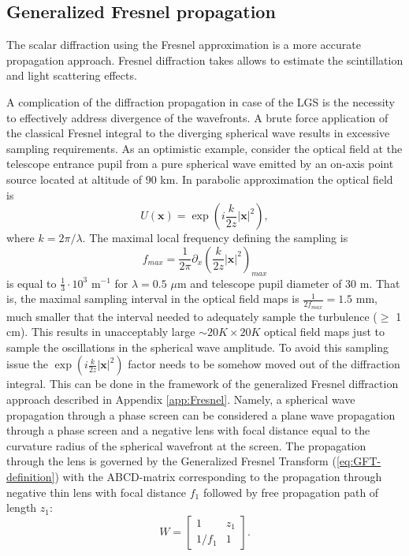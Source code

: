\subsection{Generalized Fresnel propagation}

The scalar diffraction using the Fresnel approximation is a more accurate
propagation approach. Fresnel diffraction takes allows to estimate the
scintillation and light scattering effects.

A complication of the diffraction propagation in case of the LGS is the
necessity to effectively address divergence of the wavefronts. A brute force
application of the classical Fresnel integral to the diverging spherical wave
results in excessive sampling requirements. As an optimistic example, consider
the optical
field at the telescope entrance pupil from a pure spherical wave emitted by an
on-axis point source located at altitude of 90 km. In parabolic approximation
the optical field is
$$
  U(\bm{x}) = \exp (i \frac{k}{2z} |\bm{x}|^{2}),
$$
where $k = 2 \pi / \lambda$. The maximal local frequency defining the sampling
is
$$
  f_{max} = \frac{1}{2 \pi} \partial_{x} \left( \frac{k}{2z} |\bm{x}|^{2}
  \right)_{max}
$$
is equal to $\frac{1}{3} \cdot 10^{3}$ m$^{-1}$
for $\lambda = 0.5$ $\mu$m and telescope pupil diameter of 30 m. That is, the
maximal sampling interval in the optical field maps is $\frac{1}{2 f_{max}} =
1.5$ mm, much smaller that the interval needed to adequately sample the
turbulence ($\geq$ 1 cm). This results in unacceptably large $\sim 20K \times
20K$ optical field maps just to sample the oscillations in the spherical wave
amplitude. To avoid this sampling issue the $\exp (i \frac{k}{2z}
|\bm{x}|^{2})$ factor needs to be somehow moved out of the diffraction
integral. This can be done in the
framework of the generalized Fresnel diffraction approach described in
Appendix \ref{app:Fresnel}. Namely, a spherical wave propagation through a
phase screen can be considered a plane wave propagation through a phase screen
and a negative lens with focal distance equal to the curvature radius of the
spherical wavefront at the screen. The propagation through the lens is
governed by the Generalized Fresnel Transform (\ref{eq:GFT-definition}) with
the ABCD-matrix corresponding to the propagation through negative thin lens
with focal distance $f_{1}$ followed by free propagation path of length $z_{1}$:
\begin{equation} \label{eq:lens-free-propagator}
  W = \left[  \begin{array}{cc} 1 & z_{1} \\ 1/f_{1} & 1 \end{array} \right].
\end{equation}

